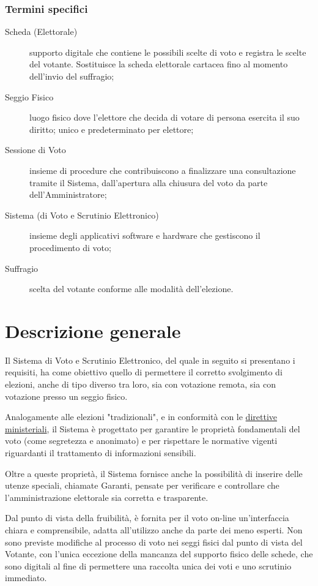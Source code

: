 \documentclass{report}
\begin{document}
\subsection{Termini specifici}
\begin{description}
	\item[Scheda (Elettorale)] supporto digitale che contiene le possibili scelte di voto e registra le scelte del votante. Sostituisce la scheda elettorale cartacea fino al momento dell'invio del suffragio;
	\item[Seggio Fisico] luogo fisico dove l'elettore che decida di votare di persona esercita il suo diritto; unico e predeterminato per elettore;
	\item[Sessione di Voto] insieme di procedure che contribuiscono a finalizzare una consultazione tramite il Sistema, dall'apertura alla chiusura del voto da parte dell'Amministratore;
	\item[Sistema (di Voto e Scrutinio Elettronico)] insieme degli applicativi software e hardware che gestiscono il procedimento di voto;
	\item[Suffragio] scelta del votante conforme alle modalità dell'elezione.
\end{description}



\chapter{Descrizione generale}
Il Sistema di Voto e Scrutinio Elettronico, del quale in seguito si presentano i requisiti, ha come obiettivo quello di permettere il corretto svolgimento di elezioni, anche di tipo diverso tra loro, sia con votazione remota, sia con votazione presso un seggio fisico.

Analogamente alle elezioni "tradizionali", e in conformità con le \href{https://www.interno.gov.it/sites/default/files/2021-07/linee_guida_voto_elettronico_decreto_9.7.2021.pdf}{direttive ministeriali}, il Sistema è progettato per garantire le proprietà fondamentali del voto (come segretezza e anonimato) e per rispettare le normative vigenti riguardanti il trattamento di informazioni sensibili. 

Oltre a queste proprietà, il Sistema fornisce anche la possibilità di inserire delle utenze speciali, chiamate Garanti, pensate per verificare e controllare che l'amministrazione elettorale sia corretta e trasparente. 

Dal punto di vista della fruibilità, è fornita per il voto on-line un'interfaccia chiara e comprensibile, adatta all'utilizzo anche da parte dei meno esperti. Non sono previste modifiche al processo di voto nei seggi fisici dal punto di vista del Votante, con l'unica eccezione della mancanza del supporto fisico delle schede, che sono digitali al fine di permettere una raccolta unica dei voti e uno scrutinio immediato.
\end{document}
